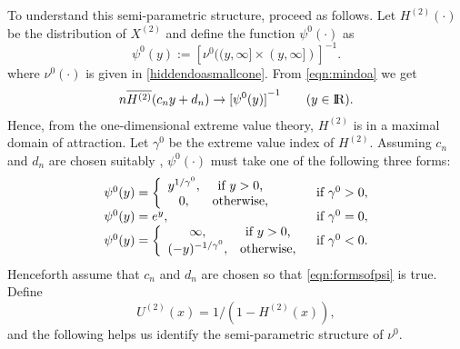 \documentclass[11 pt]{amsart}
\numberwithin{equation}{section}
\begin{document}
 To understand this semi-parametric structure,  proceed as
 follows. Let  $H^{(2)}(\cdot)$ be the distribution of $X^{(2)}$ 
 {and} define the function $\psi^0(\cdot)$ as   
\begin{equation}\label{defn:psi0}
\psi^0(y) := {\left[\nu^0((y, \infty] \times (y, \infty])\right]}^{-1}.
\end{equation}
where $\nu^0(\cdot)$ is given in \eqref{hiddendoasmallcone}. From
\eqref{eqn:mindoa} we get  
\begin{align}\label{eqn: Hconv}
n \overline {H^{(2)}}(c_n y + d_n) \rightarrow
{[\psi^0(y)]}^{-1}\qquad (y \in {\mathop{\rm I\kern -0.20em R}\nolimits}).
\end{align}
 Hence, from the one-dimensional extreme value theory, 
$H^{(2)}$ is in a maximal domain of attraction.  Let $\gamma^0$ be the extreme value
index {of $H^{(2)}$}.  Assuming $c_n$ and $d_n$ are chosen suitably \citep[page
9]{resnickbook:2008}, $\psi^0(\cdot)$ must take  one of the following
three forms: 
\begin{align}\label{eqn:formsofpsi}
\begin{array}{lc}
 \psi^0(y) = \left \{ \begin{array}{cc}
y^{1/\gamma^0}, & \hbox{if $y >0$,}\\
0, & \hbox{otherwise,}
\end{array} \right. & \hbox{if $ \gamma^0 > 0,$}\\
 \psi^0(y) = e^{y}, & \hbox{if $ \gamma^0 = 0,$}\\
 \psi^0(y) = \left \{ \begin{array}{cc}
\infty, & \hbox{if $y > 0$,}\\
(-y)^{-1/\gamma^0}, & \hbox{otherwise,}
\end{array} \right. & \hbox{if $ \gamma^0 < 0.$}
\end{array}
\end{align}
Henceforth  assume that 
 $c_n$ and $d_n$ are chosen so that \eqref{eqn:formsofpsi} is true. Define  
\begin{equation}\label{defn:U}
U^{(2)}(x) = 1/(1 - H^{(2)}(x)),
\end{equation}
{and the} following {helps us
identify the semi-parametric structure of $\nu^0$. }
\end{document}
